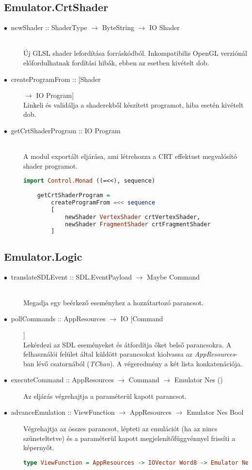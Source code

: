 \subsection{Emulator.CrtShader}

\begin{description}
	\item[$\bullet\:$ newShader :: ShaderType $\rightarrow$ ByteString $\rightarrow$ IO Shader] \hfill \\
	Új GLSL shader lefordítása forráskódból. Inkompatibilis OpenGL verziónál előfordulhatnak fordítási hibák, ebben az esetben kivételt dob.
	\item[$\bullet\:$ createProgramFrom :: [Shader] $\rightarrow$ IO Program] \hfill \\
	Linkeli és validálja a shaderekből készített programot, hiba esetén kivételt dob.
	\item[$\bullet\:$ getCrtShaderProgram :: IO Program] \hfill \\
	A modul exportált eljárása, ami létrehozza a CRT effektust megvalósító shader programot.
	
	\begin{lstlisting}[language=Haskell]
	import Control.Monad ((=<<), sequence)
	
	getCrtShaderProgram = 
		createProgramFrom =<< sequence 
		[
			newShader VertexShader crtVertexShader, 
			newShader FragmentShader crtFragmentShader
		]
	\end{lstlisting}
\end{description}

\subsection{Emulator.Logic}

\begin{description}
	\item[$\bullet\:$ translateSDLEvent :: SDL.EventPayload $\rightarrow$ Maybe Command] \hfill \\
	Megadja egy beérkező eseményhez a hozzátartozó parancsot.
	\item[$\bullet\:$ pollCommands :: AppResources $\rightarrow$ IO [Command]] \hfill \\
	Lekérdezi az SDL eseményeket és átfordítja őket belső parancsokra. A felhasználói felület által küldött parancsokat kiolvassa az \emph{AppResources}-ban lévő csatornából (\emph{TChan}). A végeredmény a két lista konkatenációja. 
	\item[$\bullet\:$ executeCommand :: AppResources $\rightarrow$ Command $\rightarrow$ Emulator Nes ()] \hfill
	Az eljárás végrehajtja a paraméterül kapott parancsot.
	\item[$\bullet\:$ advanceEmulation :: ViewFunction $\rightarrow$ AppResources $\rightarrow$ Emulator Nes Bool] \hfill
	Végrehajtja az összes parancsot, lépteti az emulációt (ha az nincs szüneteltetve) és a paraméterül kapott megjelenítőfüggvénnyel frissíti a képernyőt.
	\begin{lstlisting}[language=Haskell, basicstyle=\scriptsize]
	type ViewFunction = AppResources -> IOVector Word8 -> Emulator Nes ()
	\end{lstlisting}
\end{description}

